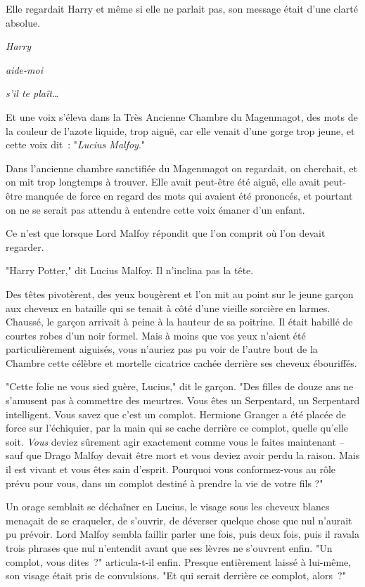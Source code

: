 Elle regardait Harry et même si elle ne parlait pas, son message était d'une clarté absolue.

\emph{Harry}

\emph{aide-moi}

\emph{s'il te plaît…}

Et une voix s'éleva dans la Très Ancienne Chambre du Magenmagot, des mots de la couleur de l'azote liquide, trop aiguë, car elle venait d'une gorge trop jeune, et cette voix dit~: "\emph{Lucius Malfoy}."

\later

Dans l'ancienne chambre sanctifiée du Magenmagot on regardait, on cherchait, et on mit trop longtemps à trouver. Elle avait peut-être été aiguë, elle avait peut-être manquée de force en regard des mots qui avaient été prononcés, et pourtant on ne se serait pas attendu à entendre cette voix émaner d'un enfant.

Ce n'est que lorsque Lord Malfoy répondit que l'on comprit où l'on devait regarder.

"Harry Potter," dit Lucius Malfoy. Il n'inclina pas la tête.

Des têtes pivotèrent, des yeux bougèrent et l'on mit au point sur le jeune garçon aux cheveux en bataille qui se tenait à côté d'une vieille sorcière en larmes. Chaussé, le garçon arrivait à peine à la hauteur de sa poitrine. Il était habillé de courtes robes d'un noir formel. Mais à moins que vos yeux n'aient été particulièrement aiguisés, vous n'auriez pas pu voir de l'autre bout de la Chambre cette célèbre et mortelle cicatrice cachée derrière ses cheveux ébouriffés.

"Cette folie ne vous sied guère, Lucius," dit le garçon. "Des filles de douze ans ne s'amusent pas à commettre des meurtres. Vous êtes un Serpentard, un Serpentard intelligent. Vous savez que c'est un complot. Hermione Granger a été placée de force sur l'échiquier, par la main qui se cache derrière ce complot, quelle qu'elle soit. \emph{Vous} deviez sûrement agir exactement comme vous le faites maintenant -- sauf que Drago Malfoy devait être mort et vous deviez avoir perdu la raison. Mais il est vivant et vous êtes sain d'esprit. Pourquoi vous conformez-vous au rôle prévu pour vous, dans un complot destiné à prendre la vie de votre fils ?"

Un orage semblait se déchaîner en Lucius, le visage sous les cheveux blancs menaçait de se craqueler, de s'ouvrir, de déverser quelque chose que nul n'aurait pu prévoir. Lord Malfoy sembla faillir parler une fois, puis deux fois, puis il ravala trois phrases que nul n'entendit avant que ses lèvres ne s'ouvrent enfin. "Un complot, vous dites~?" articula-t-il enfin. Presque entièrement laissé à lui-même, son visage était pris de convulsions. "Et qui serait derrière ce complot, alors~?"

